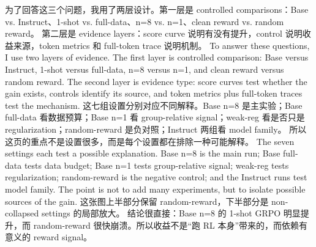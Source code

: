 {}\markdownRendererHorizontalRule{}\markdownRendererInterblockSeparator
{}\markdownRendererInterblockSeparator
{}\markdownRendererInterblockSeparator
{}为了回答这三个问题，我用了两层设计。第一层是 controlled comparisons：Base vs. Instruct、1-shot vs. full-data、n=8 vs. n=1、clean reward vs. random reward。\markdownRendererInterblockSeparator
{}第二层是 evidence layers：score curve 说明有没有提升，control 说明收益来源，token metrics 和 full-token trace 说明机制。\markdownRendererInterblockSeparator
{}\markdownRendererInterblockSeparator
{}To answer these questions, I use two layers of evidence. The first layer is controlled comparison: Base versus Instruct, 1-shot versus full-data, n=8 versus n=1, and clean reward versus random reward.\markdownRendererInterblockSeparator
{}The second layer is evidence type: score curves test whether the gain exists, controls identify its source, and token metrics plus full-token traces test the mechanism.\markdownRendererInterblockSeparator
{}\markdownRendererHorizontalRule{}\markdownRendererInterblockSeparator
{}\markdownRendererInterblockSeparator
{}\markdownRendererInterblockSeparator
{}这七组设置分别对应不同解释。Base n=8 是主实验；Base full-data 看数据预算；Base n=1 看 group-relative signal；weak-reg 看是否只是 regularization；random-reward 是负对照；Instruct 两组看 model family。\markdownRendererInterblockSeparator
{}所以这页的重点不是设置很多，而是每个设置都在排除一种可能解释。\markdownRendererInterblockSeparator
{}\markdownRendererInterblockSeparator
{}The seven settings each test a possible explanation. Base n=8 is the main run; Base full-data tests data budget; Base n=1 tests group-relative signal; weak-reg tests regularization; random-reward is the negative control; and the Instruct runs test model family.\markdownRendererInterblockSeparator
{}The point is not to add many experiments, but to isolate possible sources of the gain.\markdownRendererInterblockSeparator
{}\markdownRendererHorizontalRule{}\markdownRendererInterblockSeparator
{}\markdownRendererInterblockSeparator
{}\markdownRendererInterblockSeparator
{}这张图上半部分保留 random-reward，下半部分是 non-collapsed settings 的局部放大。\markdownRendererInterblockSeparator
{}结论很直接：Base n=8 的 1-shot GRPO 明显提升，而 random-reward 很快崩溃。所以收益不是“跑 RL 本身”带来的，而依赖有意义的 reward signal。\markdownRendererInterblockSeparator
